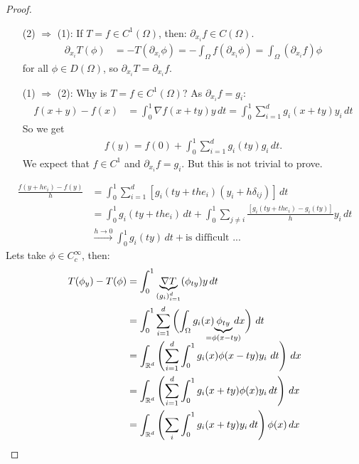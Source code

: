 \documentclass{report}
\theoremstyle{tommy}
\begin{document}
  \begin{proof} \
    \begin{itemize}
      \item [(2) \(\Rightarrow\) (1):] If \(T = f \in C^1(\Omega)\), then: \(\partial_{x_i} f \in C(\Omega)\).
      \begin{align*}
        \partial_{x_i} T(\phi) &= - T(\partial_{x_i} \phi) 
        = - \int_\Omega f(\partial_{x_i} \phi) = \int_\Omega (\partial_{x_i} f) \phi
      \end{align*}
      for all \(\phi \in D(\Omega)\), so \(\partial_{x_i} T = \partial_{x_i} f\).
      \item [(1) \(\Rightarrow\) (2):] Why is \(T = f \in C^1(\Omega)\)? As \(\partial_{x_i} f = g_i\): 
      \begin{align*}
        f(x+y) - f(x) 
        &= \int_0^1 \nabla f(x+ty) y \, dt
        = \int_0^1 \sum_{i=1}^d g_i(x + ty) y_i \, dt
      \end{align*}
      So we get
      \begin{align*}
        f(y) = f(0) + \int_0^1 \sum_{i=1}^d g_i(ty) g_i \, dt.
      \end{align*}
      We expect that \(f \in C^1\) and \(\partial_{x_i} f = g_i\). But this is not trivial to prove.
    \end{itemize}
    \begin{align*}
      \frac{f(y + he_i) - f(y)}{h} 
      &= \int_0^1 \sum_{i=1}^d [g_i(ty + the_i)(y_i + h \delta_{ij})] \, dt \\
      &= \int_0^1 g_i(ty + the_i) \, dt + \int_0^1 \sum_{j \ne i} \frac{[g_i(ty + the_i) - g_i(ty)]}{h} y_i \, dt \\
      &\xrightarrow{h \to 0} \int_0^1 g_i(ty) \, dt  + \text{is difficult ...}
    \end{align*}
    Lets take \(\phi \in C_c^\infty\), then:
    \begin{align*}
      T(\phi_{y}) - T(\phi)
      &= \int_0^1 \underbrace{\nabla T}_{(g_i)_{i=1}^d} (\phi_{ty}) y \, dt \\
      &= \int_0^1 \sum_{i=1}^d \left(\int_\Omega g_i(x) \smash{\underbrace{\phi_{ty} }_{\mathclap{= \phi(x - ty)}}} \, dx \right) \, dt \\
      &= \int_{\mathbb{R}^d} \left(\sum_{i=1}^d \int_0^1 g_i(x) \phi(x-ty) y_i \ dt\right) \, dx \\
      &= \int_{\mathbb{R}^d} \left(\sum_{i=1}^d \int_0^1 g_i(x + ty) \phi(x) y_i \, dt\right) \, dx \\
      &= \int_{\mathbb{R}^d} \left(\sum_i \int_0^1 g_i(x + ty) y_i \, dt \right) \phi(x) \, dx

\end{align*}
\end{proof}
\end{document}
